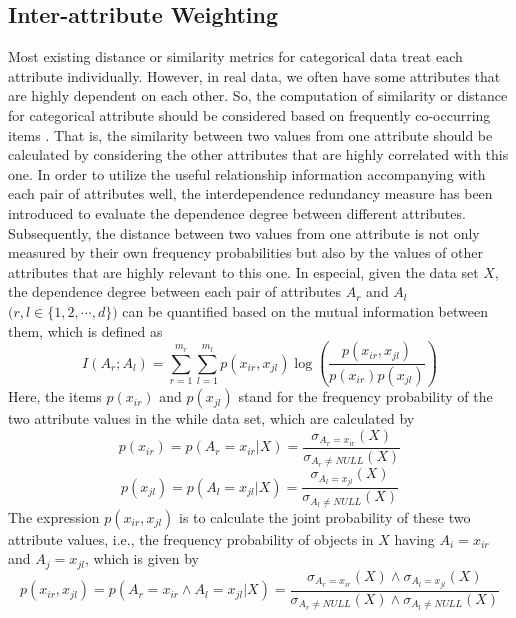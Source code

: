 \documentclass[review]{elsarticle}
\begin{document}
\subsection{Inter-attribute Weighting}
Most existing distance or similarity metrics for categorical data treat each attribute individually. However, in real data, we often have some attributes that are highly dependent on each other. So, the computation of similarity or distance for categorical attribute should be considered based on frequently co-occurring items \cite{VGanti1999CACTUS}. That is, the similarity between two values from one attribute should be calculated by considering the other attributes that are highly correlated with this one. In order to utilize the useful relationship information accompanying with each pair of attributes well, the interdependence redundancy measure \cite{WaiHoAu2005Grouping} has been introduced to evaluate the dependence degree between different attributes. Subsequently, the distance between two values from one attribute is not only measured by their own frequency probabilities but also by the values of other attributes that are highly relevant to this one. In especial, given the data set $X$, the dependence degree between each pair of attributes $A_r$ and $A_l$ $\mathbf (r,l \in \{1,2,\cdots,d\})$ can be quantified based on the mutual information \cite{MacKay2003InformationTheory} between them, which is defined as
\begin{equation}
I(A_r;A_l) = \sum_{r=1}^{m_r}\sum_{l=1}^{m_l}p(x_{ir},x_{jl})\log(\frac{p(x_{ir},x_{jl})}{p(x_{ir})p(x_{jl})})
\label{equ10}
\end{equation}
Here, the items $p(x_{ir})$ and $p(x_{jl})$ stand for the frequency probability of the two attribute values in the while data set, which are calculated by
\begin{equation}
p(x_{ir}) = p(A_r = x_{ir}|X) = \frac{\sigma_{A_r = x_{ir}}(X)}{\sigma_{A_r \neq NULL}(X)}
\label{equ11}
\end{equation}
\begin{equation}
p(x_{jl}) = p(A_l = x_{jl}|X) = \frac{\sigma_{A_l = x_{jl}}(X)}{\sigma_{A_l \neq NULL}(X)}
\label{equ12}
\end{equation}
The expression $p(x_{ir},x_{jl})$ is to calculate the joint probability of these two attribute values, i.e., the frequency probability of objects in $X$ having $A_i = x_{ir}$ and $A_j = x_{jl}$, which is given by
\begin{equation}
p(x_{ir},x_{jl}) = p(A_r = x_{ir} \wedge A_l = x_{jl}|X) = \frac{\sigma_{A_r = x_{ir}}(X) \wedge \sigma_{A_l = x_{jl}}(X)}{\sigma_{A_r \neq NULL}(X) \wedge \sigma_{A_l \neq NULL}(X)}
\label{equ13}
\end{equation}
\end{document}
